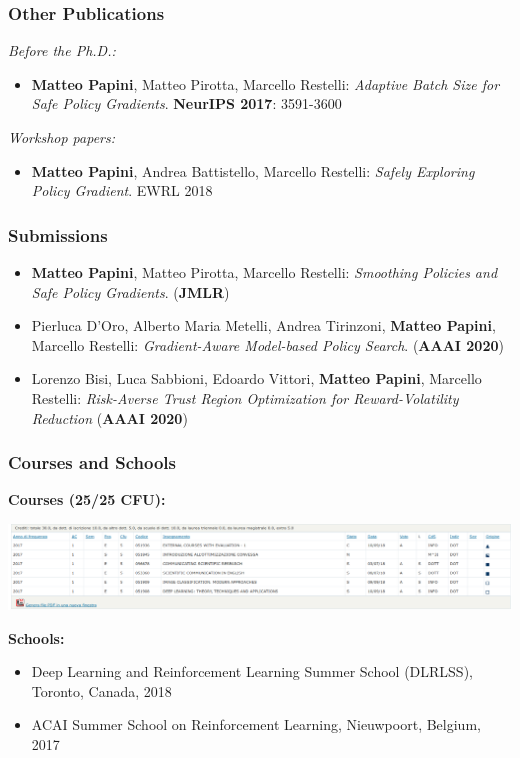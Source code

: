 \documentclass[aspectratio=169]{beamer}
\begin{document}
\begin{frame}
\frametitle{Other Publications}
\emph{Before the Ph.D.:}
\begin{itemize}
	\small
	\setlength{\itemsep}{10pt}
	\item  \textbf{Matteo Papini}, Matteo Pirotta, Marcello Restelli:
	\emph{Adaptive Batch Size for Safe Policy Gradients}. \textbf{NeurIPS 2017}: 3591-3600
\end{itemize}

\vfill

\emph{Workshop papers:}
\begin{itemize}
	\small
	\item  \textbf{Matteo Papini}, Andrea Battistello, Marcello Restelli: \emph{Safely Exploring Policy Gradient}. EWRL 2018 
\end{itemize}
\end{frame}

\begin{frame}
\frametitle{Submissions}
\begin{itemize}
	\small
	\setlength{\itemsep}{10pt}
	\item  \textbf{Matteo Papini}, Matteo Pirotta, Marcello Restelli:
	\emph{Smoothing Policies and Safe Policy Gradients}. (\textbf{JMLR})
	\item  Pierluca D'Oro, Alberto Maria Metelli, Andrea Tirinzoni, \textbf{Matteo Papini}, Marcello Restelli:
	\emph{Gradient-Aware Model-based Policy Search}. (\textbf{AAAI 2020})
	\item   Lorenzo Bisi, Luca Sabbioni, Edoardo Vittori, \textbf{Matteo Papini}, Marcello Restelli: \emph{Risk-Averse Trust Region Optimization for Reward-Volatility Reduction} (\textbf{AAAI 2020})
\end{itemize}
\end{frame}

\begin{frame}
\frametitle{Courses and Schools}
\textbf{Courses (25/25 CFU):}

\includegraphics[width=\textwidth]{pics/corsi.png}
\vfill

\textbf{Schools:}
\begin{itemize}
	\item  Deep Learning and Reinforcement Learning Summer School (DLRLSS), Toronto, Canada, 2018
	\item  ACAI Summer School on Reinforcement Learning, Nieuwpoort, Belgium, 2017
\end{itemize}
\end{frame}
\end{document}
